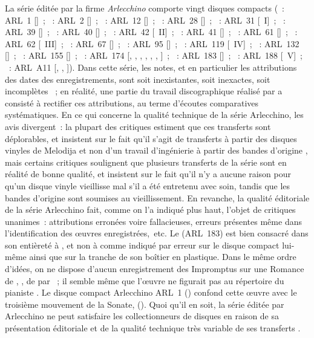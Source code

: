 La série éditée par la firme \emph{Arlecchino} comporte vingt disques
compacts (~: ARL~1 [\Schumann{}]~; ~: ARL~2
[\Schubert{}]~; ~: ARL~12 [\Schumann{}]~; ~: ARL~28
[\Liszt{}]~; ~: ARL~31 [\Scriabine{}~I]~; ~: ARL~39
[\Schumann{}]~; ~: ARL~40 [\Beethoven{}]~; ~: ARL~42
[\Scriabine{}~II]~; ~: ARL~41 [\Chopin{}]~; ~: ARL~61
[\Chopin{}]~; ~: ARL~62 [\Scriabine{}~III]~; ~: ARL~67
[\Schubert{}]~; ~: ARL~95 [\Chopin{}]~; ~: ARL~119
[\Scriabine{}~IV]~; ~: ARL~132 [\Rachmaninov{}]~; ~:
ARL~155 [\Schumann{}]~; ~: ARL~174 [\Debussy{}, \Borodine{},
\Liadov{}, \Medtner{}, \Blumenfeld{}, \Goltz{}, \Glazounov{}]~;
~: ARL~183 [\Schubert{}]~; ~: ARL~188
[\Scriabine{}~V]~; ~: ARL~A11 [\Mozart{}, \Beethoven{},
\Mendelssohn{}]).
Dans cette série, les notes, et en particulier les attributions des dates
des enregistrements, sont soit inexistantes, soit inexactes, soit
incomplètes \citep[voir][p.~62]{Juban}~; en réalité, une partie du travail
discographique réalisé par \FMalik{} \citep[voir][]{Malik} a consisté à
rectifier ces attributions, au terme d'écoutes comparatives systématiques.
En ce qui concerne la qualité technique de la série Arlecchino, les avis
divergent~: la plupart des critiques estiment que ces transferts sont
déplorables, et insistent sur le fait qu'il s'agit de transferts à partir
des disques vinyles de Melodija et non d'un travail d'ingénierie à partir
des bandes d'origine \citep[voir][p.~62]{Juban}, mais certains critiques
soulignent que plusieurs transferts de la série sont en réalité de bonne
qualité, et insistent sur le fait qu'il n'y a aucune raison pour qu'un
disque vinyle vieillisse mal s'il a été entretenu avec soin, tandis que les
bandes d'origine sont soumises au vieillissement.
En revanche, la qualité éditoriale de la série Arlecchino fait, comme on l'a
indiqué plus haut, l'objet de critiques unanimes~: attributions erronées
voire fallacieuses, erreurs présentes même dans l'identification des œuvres
enregistrées,~etc.
Le  (ARL~183) est bien consacré dans son entièreté à \Schubert{},
et non à \Mozart{} comme indiqué par erreur sur le disque compact lui-même
ainsi que sur la tranche de son boîtier en plastique.
Dans le même ordre d'idées, on ne dispose d'aucun enregistrement des
Impromptus sur une Romance de \CWieck{}, , de \Schumann{} par
\VSofronitsky{}~; il semble même que l'œuvre ne figurait pas au répertoire
du pianiste \citep[voir][p.~75]{White}.
Le disque compact Arlecchino ARL~1 () confond cette œuvre avec le
troisième mouvement de la Sonate,  ().
Quoi qu'il en soit, la série éditée par Arlecchino ne peut satisfaire les
collectionneurs de disques en raison de sa présentation éditoriale et de la
qualité technique très variable de ses transferts
\citep[voir][p.~62]{Juban}.

